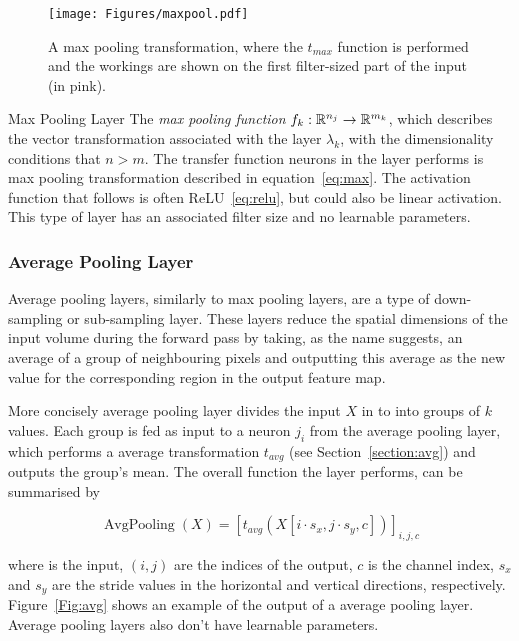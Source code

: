 \begin{figure}[ht!]
	\begin{center}
		\texttt{[image: Figures/maxpool.pdf]}
	\end{center}
	\caption{A max pooling transformation, where the $t_{max}$ function is performed and the workings are shown on the first filter-sized part of the input (in pink).}
	\label{Fig:maxpooling}
\end{figure} 


\begin{Definition}{Max Pooling Layer}{}
The \emph{max pooling function} $f_k:\mathbb{R}^{n_j}\to \mathbb{R}^{m_k}$, which describes the vector transformation associated with the layer $\lambda_k$, with the dimensionality conditions that $n > m$. The transfer function neurons in the layer performs is max pooling transformation described in equation~\eqref{eq:max}. The activation function that follows is often ReLU~\eqref{eq:relu}, but could also be linear activation. This type of layer has an associated filter size and no learnable parameters.
\end{Definition}

\subsubsection{Average Pooling Layer}
\label{section:avglayer}
Average pooling layers, similarly to max pooling layers, are a type of down-sampling or sub-sampling layer. These layers reduce the spatial dimensions of the input volume during the forward pass by taking, as the name suggests, an average of a group of neighbouring pixels and outputting this average as the new value for the corresponding region in the output feature map.

More concisely average pooling layer divides the input $X$ in to into groups of $k$ values. Each group is fed as input to a neuron $j_i$ from the average pooling layer, which performs a average transformation $t_{avg}$ (see Section~\ref{section:avg}) and outputs the group's mean. The overall function the layer performs, can be summarised by 

\begin{equation}
\operatorname{AvgPooling}(X)= [t_{avg}(X[i \cdot s_x, j \cdot s_y, c])]_{i,j,c}
\label{eq:maxlayer}
\end{equation}

where is the input, $(i,j)$ are the indices of the output, $c$ is the channel index, $s_x$ and $s_y$ are the stride values in the horizontal and vertical directions, respectively. Figure~\ref{Fig:avg} shows an example of the output of a average pooling layer. Average pooling layers also don't have learnable parameters.


